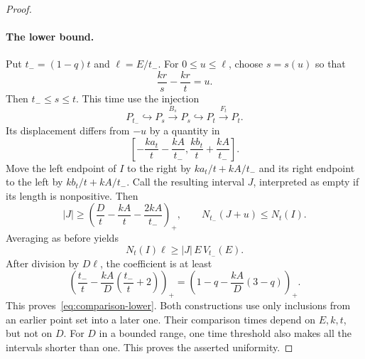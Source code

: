 \documentclass[11pt]{article}
\theoremstyle{remark}
\numberwithin{equation}{section}
\begin{document}
\begin{proof}
\paragraph{The lower bound.}
Put $t_-=(1-q)t$ and $\ell=E/t_-$. For $0\leq u\leq\ell$, choose
$s=s(u)$ so that
\[
  \frac{kr}{s}-\frac{kr}{t}=u.
\]
Then $t_-\leq s\leq t$. This time use the injection
\[
  P_{t_-}\hookrightarrow P_s\xrightarrow{B_s}P_s
  \hookrightarrow P_t\xrightarrow{F_t}P_t.
\]
Its displacement differs from $-u$ by a quantity in
\[
  \left[-\frac{ka_t}{t}-\frac{kA}{t_-},
         \frac{kb_t}{t}+\frac{kA}{t_-}\right].
\]
Move the left endpoint of $I$ to the right by $ka_t/t+kA/t_-$ and its
right endpoint to the left by $kb_t/t+kA/t_-$. Call the resulting interval
$J$, interpreted as empty if its length is nonpositive. Then
\[
  |J|\geq
  \left(\frac Dt-\frac{kA}{t}-\frac{2kA}{t_-}\right)_+,
  \qquad
  N_{t_-}(J+u)\leq N_t(I).
\]
Averaging as before yields
\[
  N_t(I)\ell\geq |J|\,E\,V_{t_-}(E).
\]
After division by $D\ell$, the coefficient is at least
\[
  \left(\frac{t_-}{t}-\frac{kA}{D}
       \left(\frac{t_-}{t}+2\right)\right)_+
  =\left(1-q-\frac{kA}{D}(3-q)\right)_+.
\]
This proves~\eqref{eq:comparison-lower}.
Both constructions use only inclusions from an earlier point set into a
later one. Their comparison times depend on $E,k,t$, but not on $D$.
For $D$ in a bounded range, one time threshold also makes all the intervals
shorter than one. This proves the asserted uniformity.
\end{proof}
\end{document}
